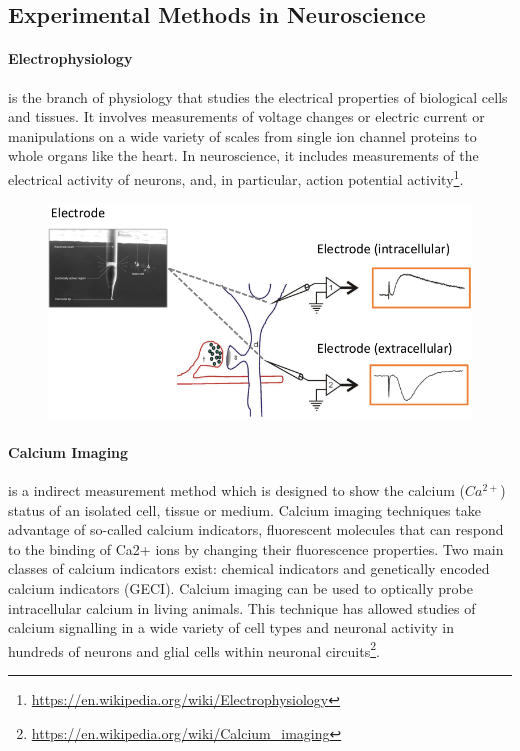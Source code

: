 \documentclass[main]{subfiles}
\begin{document}
\subsection{Experimental Methods in Neuroscience}
\paragraph{Electrophysiology} is the branch of physiology that studies the electrical properties of biological cells and tissues. It involves measurements of voltage changes or electric current or manipulations on a wide variety of scales from single ion channel proteins to whole organs like the heart. In neuroscience, it includes measurements of the electrical activity of neurons, and, in particular, action potential activity\footnote{\url{https://en.wikipedia.org/wiki/Electrophysiology}}.

\begin{figure}[H]
    \centering
    \includegraphics[width=0.99\linewidth]{01_Introduction/figures/electrophysiology.png}
    \caption{}
    \label{fig:basalandcerebellum}
\end{figure}


\paragraph{Calcium Imaging} is a indirect measurement method which is designed to show the calcium ($Ca^{2+}$) status of an isolated cell, tissue or medium. Calcium imaging techniques take advantage of so-called calcium indicators, fluorescent molecules that can respond to the binding of Ca2+ ions by changing their fluorescence properties. Two main classes of calcium indicators exist: chemical indicators and genetically encoded calcium indicators (GECI). Calcium imaging can be used to optically probe intracellular calcium in living animals. This technique has allowed studies of calcium signalling in a wide variety of cell types and neuronal activity in hundreds of neurons and glial cells within neuronal circuits\footnote{\url{https://en.wikipedia.org/wiki/Calcium_imaging}}. 
\end{document}
